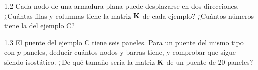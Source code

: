 \begin{ejercicio}{1.2}
Cada nodo de una armadura plana puede desplazarse en dos direcciones.
¿Cuántas filas y columnas tiene la matriz $\mathbf{K}$ de cada ejemplo? ¿Cuántos
números tiene la del ejemplo C?
\end{ejercicio}

\begin{ejercicio}{1.3}
El puente del ejemplo C tiene seis paneles. Para un puente del mismo tipo
con $p$ paneles, deducir cuántos nodos y barras tiene, y comprobar que sigue
siendo isostático. ¿De qué tamaño sería la matriz $\mathbf{K}$ de un puente de 20
paneles?
\end{ejercicio}
